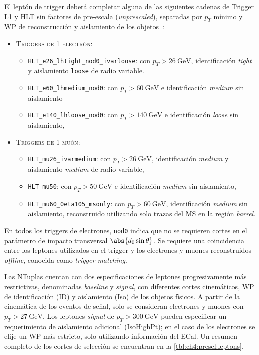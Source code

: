 El leptón de trigger deberá completar alguna de las siguientes cadenas de Trigger L1 y HLT sin factores de pre-escala (\textit{unprescaled}), separadas por $p_T$ mínimo y WP de reconstrucción y aislamiento de los objetos~\cite{TheATLASCollaboration2020a,Rettie2018}:
\begin{itemize}
    \item \textsc{Triggers de {\footnotesize 1} electrón:}
    \begin{itemize}
        \small
        \item \texttt{HLT\_e26\_lhtight\_nod0\_ivarloose}: con $p_T > \SI{26}{\GeV}$, identificación \textit{tight} y aislamiento \texttt{loose} de radio variable.
        \item \texttt{HLT\_e60\_lhmedium\_nod0}: con $p_T > \SI{60}{\GeV}$ e identificación \textit{medium} sin aislamiento
        \item \texttt{HLT\_e140\_lhloose\_nod0}: con $p_T > \SI{140}{\GeV}$ e identificación \textit{loose} sin aislamiento,
    \end{itemize}
    \item \textsc{Triggers de {\footnotesize 1} muón:}
    \begin{itemize}
        \small
        \item \texttt{HLT\_mu26\_ivarmedium}: con $p_T > \SI{26}{\GeV}$, identificación \textit{medium} y aislamiento \textit{medium} de radio variable,
        \item \texttt{HLT\_mu50}: con $p_T > \SI{50}{\GeV}$ e identificación \textit{medium} sin aislamiento,
        \item \texttt{HLT\_mu60\_0eta105\_msonly}: con $p_T > \SI{60}{\GeV}$, identificación \textit{medium} sin aislamiento, reconstruido utilizando solo trazas del MS en la región \textit{barrel}.
    \end{itemize}
\end{itemize}
En todos los triggers de electrones, \texttt{nod0} indica que no se requieren cortes en el parámetro de impacto transversal $\abs{d_0 \sin\theta}$. Se requiere una coincidencia entre los leptones utilizados en el trigger y los electrones y muones reconstruidos \textit{offline}, conocida como \textit{trigger matching}.

Las NTuplas cuentan con dos especificaciones de leptones progresivamente más restrictivas, denominadas \textit{baseline} y \textit{signal}, con diferentes cortes cinemáticos, WP de identificación (ID) y aislamiento (Iso) de los objetos físicos. A partir de la cinemática de los eventos de señal, solo se consideran electrones y muones con $p_T > \SI{27}{\GeV}$. Los leptones \textit{signal} de $p_T > \SI{300}{\GeV}$ pueden especificar un requerimiento de aislamiento adicional (IsoHighPt); en el caso de los electrones se elije un WP más estricto, solo utilizando información del ECal. Un resumen completo de los cortes de selección se encuentran en la \cref{tbl:ch4:presel:leptons}.


